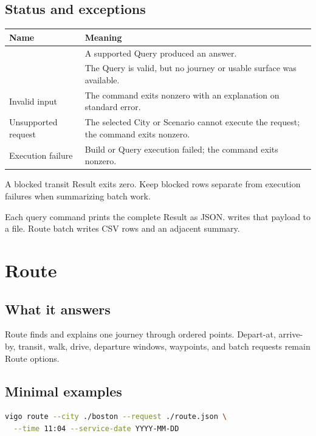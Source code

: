 \documentclass[10pt,letterpaper]{article}
\begin{document}
\subsection{Status and exceptions}

\begin{center}
\begin{tabularx}{\linewidth}{P{1.35in} Y}
\toprule
\textbf{Name} & \textbf{Meaning} \\
\midrule
{} & A supported Query produced an answer. \\
 & The Query is valid, but no journey or usable surface was available. \\
Invalid input & The command exits nonzero with an explanation on standard error. \\
Unsupported request & The selected City or Scenario cannot execute the request; the command exits nonzero. \\
Execution failure & Build or Query execution failed; the command exits nonzero. \\
\bottomrule
\end{tabularx}
\end{center}

A blocked transit Result exits zero. Keep blocked rows separate from execution failures when summarizing batch work.

Each query command prints the complete Result as JSON.  writes that payload to a file. Route batch writes CSV rows and an adjacent summary.

\section{Route}

\subsection{What it answers}

Route finds and explains one journey through ordered points. Depart-at, arrive-by, transit, walk, drive, departure windows, waypoints, and batch requests remain Route options.

\subsection{Minimal examples}

\begin{lstlisting}[language=bash]
vigo route --city ./boston --request ./route.json \
  --time 11:04 --service-date YYYY-MM-DD
\end{lstlisting}
\end{document}
